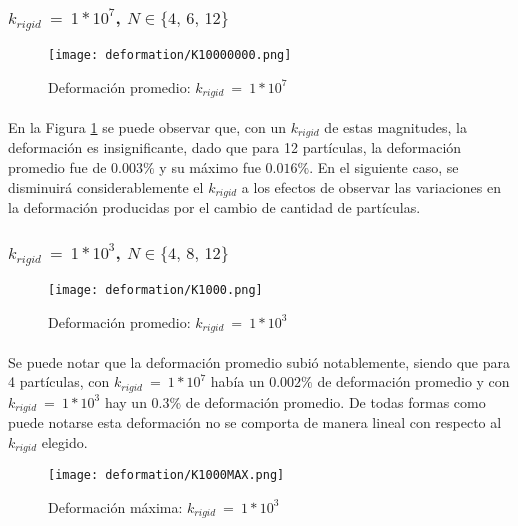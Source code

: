\documentclass[12pt, twocolumn]{article}
\begin{document}
	\subsubsection{$k_{rigid}\:=\:1*10^7$, $N \in \{4,\,6,\,12\}$}
	
    \begin{figure}[H]
		\centering
		\texttt{[image: deformation/K10000000.png]}
		\caption{Deformación promedio: $k_{rigid}\:=\:1*10^7$}
		\label{def1e7}
	\end{figure}
	
	\paragraph{} En la Figura \ref{def1e7} se puede observar que, con un $k_{rigid}$ de estas magnitudes, la deformación es insignificante, dado que para 12 partículas, la deformación promedio fue de $0.003\%$ y su máximo fue $0.016\%$. En el siguiente caso, se disminuirá considerablemente el $k_{rigid}$ a los efectos de observar las variaciones en la deformación producidas por el cambio de cantidad de partículas.
	
	\subsubsection{$k_{rigid}\:=\:1*10^3$, $N \in \{4,\,8,\,12\}$}
	
    \begin{figure}[H]
		\centering
		\texttt{[image: deformation/K1000.png]}
		\caption{Deformación promedio: $k_{rigid}\:=\:1*10^3$}
		\label{def1e3}
	\end{figure}
	
	\paragraph{} Se puede notar que la deformación promedio subió notablemente, siendo que para 4 partículas, con $k_{rigid}\:=\:1*10^7$ había un  $0.002\%$ de deformación promedio y con $k_{rigid}\:=\:1*10^3$ hay un $0.3\%$ de deformación promedio. De todas formas como puede notarse esta deformación no se comporta de manera lineal con respecto al $k_{rigid}$ elegido.
	
	
    \begin{figure}[H]
		\centering
		\texttt{[image: deformation/K1000MAX.png]}
		\caption{Deformación máxima: $k_{rigid}\:=\:1*10^3$}
		\label{defmax1e3}
	\end{figure}
	
\end{document}
